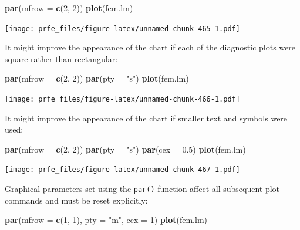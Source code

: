 \documentclass[12pt,a4paper]{book}
\newenvironment{Shaded}{\begin{snugshade}}{\end{snugshade}}
\newcommand{\DataTypeTok}[1]{\textcolor[rgb]{0.13,0.29,0.53}{#1}}
\newcommand{\DecValTok}[1]{\textcolor[rgb]{0.00,0.00,0.81}{#1}}
\newcommand{\FloatTok}[1]{\textcolor[rgb]{0.00,0.00,0.81}{#1}}
\newcommand{\KeywordTok}[1]{\textcolor[rgb]{0.13,0.29,0.53}{\textbf{#1}}}
\newcommand{\NormalTok}[1]{#1}
\newcommand{\StringTok}[1]{\textcolor[rgb]{0.31,0.60,0.02}{#1}}
\theoremstyle{definition}
\theoremstyle{definition}
\theoremstyle{definition}
\theoremstyle{remark}
\begin{document}
\begin{Shaded}
\begin{Highlighting}[]
\KeywordTok{par}\NormalTok{(}\DataTypeTok{mfrow =} \KeywordTok{c}\NormalTok{(}\DecValTok{2}\NormalTok{, }\DecValTok{2}\NormalTok{))}
\KeywordTok{plot}\NormalTok{(fem.lm)}
\end{Highlighting}
\end{Shaded}

\texttt{[image: prfe\_files/figure-latex/unnamed-chunk-465-1.pdf]}

It might improve the appearance of the chart if each of the diagnostic
plots were square rather than rectangular:

\begin{Shaded}
\begin{Highlighting}[]
\KeywordTok{par}\NormalTok{(}\DataTypeTok{mfrow =} \KeywordTok{c}\NormalTok{(}\DecValTok{2}\NormalTok{, }\DecValTok{2}\NormalTok{))}
\KeywordTok{par}\NormalTok{(}\DataTypeTok{pty =} \StringTok{"s"}\NormalTok{)}
\KeywordTok{plot}\NormalTok{(fem.lm)}
\end{Highlighting}
\end{Shaded}

\texttt{[image: prfe\_files/figure-latex/unnamed-chunk-466-1.pdf]}

It might improve the appearance of the chart if smaller text and symbols
were used:

\begin{Shaded}
\begin{Highlighting}[]
\KeywordTok{par}\NormalTok{(}\DataTypeTok{mfrow =} \KeywordTok{c}\NormalTok{(}\DecValTok{2}\NormalTok{, }\DecValTok{2}\NormalTok{))}
\KeywordTok{par}\NormalTok{(}\DataTypeTok{pty =} \StringTok{"s"}\NormalTok{)}
\KeywordTok{par}\NormalTok{(}\DataTypeTok{cex =} \FloatTok{0.5}\NormalTok{)}
\KeywordTok{plot}\NormalTok{(fem.lm)}
\end{Highlighting}
\end{Shaded}

\texttt{[image: prfe\_files/figure-latex/unnamed-chunk-467-1.pdf]}

Graphical parameters set using the \texttt{par()} function affect all
subsequent plot commands and must be reset explicitly:

\begin{Shaded}
\begin{Highlighting}[]
\KeywordTok{par}\NormalTok{(}\DataTypeTok{mfrow =} \KeywordTok{c}\NormalTok{(}\DecValTok{1}\NormalTok{, }\DecValTok{1}\NormalTok{), }\DataTypeTok{pty =} \StringTok{"m"}\NormalTok{, }\DataTypeTok{cex =} \DecValTok{1}\NormalTok{)}
\KeywordTok{plot}\NormalTok{(fem.lm)}
\end{Highlighting}
\end{Shaded}
\end{document}
